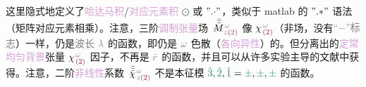 这里隐式地定义了\textcolor{Plum}{哈达马积}/\textcolor{Plum}{对应元素积} $\odot$ 或 $"{.\cdot}"$，类似于 matlab 的 $"{.*}"$ 语法（矩阵对应元素相乘）。注意，三阶\textcolor{Plum}{调制张量}\textcolor{NavyBlue}{场} $\Xint{\mathcolor{gray}{-}}{18}{\bar{\bar{\bar{M}}}}^{\;\! \mathcolor{gray}{\omega} }_{\;\! \mathcolor{gray}{z} \textcolor{Maroon}{(2)} }$ 像 ${\chi}^{\;\! \mathcolor{gray}{\omega} }_{\;\! \textcolor{Maroon}{(2)} }$（\textcolor{NavyBlue}{非场}，没有\textcolor{gray}{“$-$”标志}）一样，仍是\textcolor{gray}{波长} $\mathcolor{gray}{\lambda}$ 的函数，即仍是 $\mathcolor{gray}{\omega}$ \textcolor{NavyBlue}{色散}（\textcolor{Plum}{各向异性}）的。但分离出的\textcolor{Plum}{定常}\textcolor{Plum}{均匀背景}张量 ${\chi}^{\;\! \mathcolor{gray}{\omega} }_{\;\! \textcolor{Maroon}{(2)} }$ 因子，不再是 $\mathcolor{gray}{\bar{r}}$ 的函数，并且可以从许多\textcolor{NavyBlue}{实验主导}的文献中获得\cite{nyePhysicalPropertiesCrystals2012,zuOpticalSecondHarmonic2024,zuAnalyticalNumericalModeling2022,gananyQuasiphaseMatchingLiNbO32006,segondsLinearNonlinearOptical2004,dolevLinearNonlinearOptical2009,kaschkeCalculationNonlinearOptical1989,itoGeneralizedStudyAngular1975}。注意，二阶\textcolor{Plum}{非线性}系数 $\Xint{{}^{}_{\mathcolor{gray}{-}}}{23}{\bar{\bar{\bar{\chi}}}}^{\;\! \mathcolor{gray}{\omega} }_{\;\! \mathcolor{gray}{z} \textcolor{Maroon}{(2)} }$ 不是\textcolor{PineGreen}{本征模} $\textcolor{PineGreen}{\hat{3}},\textcolor{PineGreen}{\hat{2}},\textcolor{PineGreen}{\hat{1}} = \textcolor{PineGreen}{\pm},\textcolor{PineGreen}{\pm},\textcolor{PineGreen}{\pm}$ 的函数。

